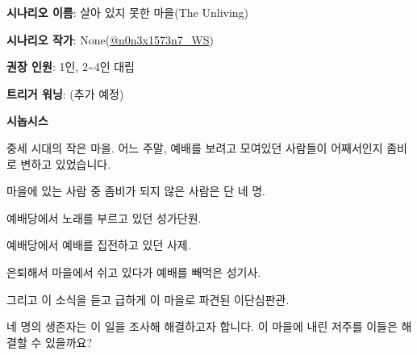 \documentclass{report}
\begin{document}
	\textbf{시나리오 이름}: 살아 있지 못한 마을(The Unliving)
	
	\textbf{시나리오 작가}: None(\href{https://www.twitter.com/n0n3x1573n7_WS}{@n0n3x1573n7\_WS})
	
	\textbf{권장 인원}: 1인, 2\textasciitilde4인 대립
	
	\textbf{트리거 워닝}: (추가 예정)
	
	\textbf{시놉시스}
	
	중세 시대의 작은 마을. 어느 주말, 예배를 보려고 모여있던 사람들이 어째서인지 좀비로 변하고 있었습니다.
	
	마을에 있는 사람 중 좀비가 되지 않은 사람은 단 네 명.
	
	예배당에서 노래를 부르고 있던 성가단원.
	
	예배당에서 예배를 집전하고 있던 사제.
	
	은퇴해서 마을에서 쉬고 있다가 예배를 빼먹은 성기사.
	
	그리고 이 소식을 듣고 급하게 이 마을로 파견된 이단심판관.
	
	네 명의 생존자는 이 일을 조사해 해결하고자 합니다. 이 마을에 내린 저주를 이들은 해결할 수 있을까요?
\end{document}
